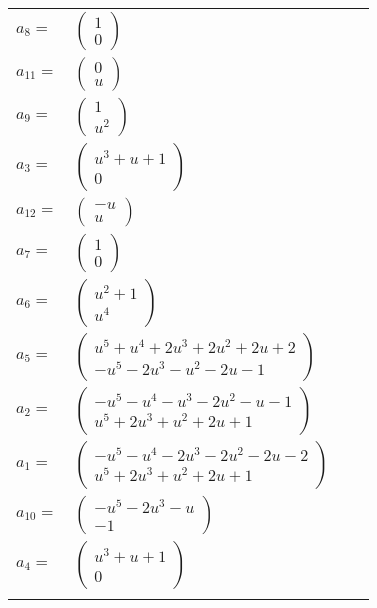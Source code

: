 \documentclass[1p]{elsarticle_modified}
\theoremstyle{definition}
\begin{document}
\begin{tabular}{m{7pt} m{180pt} m{7pt} m{180pt} }
\flushright $a_{8}=$&$\begin{pmatrix}1\\0\end{pmatrix}$ \\
\flushright $a_{11}=$&$\begin{pmatrix}0\\u\end{pmatrix}$ \\
\flushright $a_{9}=$&$\begin{pmatrix}1\\u^2\end{pmatrix}$ \\
\flushright $a_{3}=$&$\begin{pmatrix}u^3+u+1\\0\end{pmatrix}$ \\
\flushright $a_{12}=$&$\begin{pmatrix}- u\\u\end{pmatrix}$ \\
\flushright $a_{7}=$&$\begin{pmatrix}1\\0\end{pmatrix}$ \\
\flushright $a_{6}=$&$\begin{pmatrix}u^2+1\\u^4\end{pmatrix}$ \\
\flushright $a_{5}=$&$\begin{pmatrix}u^5+u^4+2 u^3+2 u^2+2 u+2\\- u^5-2 u^3- u^2-2 u-1\end{pmatrix}$ \\
\flushright $a_{2}=$&$\begin{pmatrix}- u^5- u^4- u^3-2 u^2- u-1\\u^5+2 u^3+u^2+2 u+1\end{pmatrix}$ \\
\flushright $a_{1}=$&$\begin{pmatrix}- u^5- u^4-2 u^3-2 u^2-2 u-2\\u^5+2 u^3+u^2+2 u+1\end{pmatrix}$ \\
\flushright $a_{10}=$&$\begin{pmatrix}- u^5-2 u^3- u\\-1\end{pmatrix}$ \\
\flushright $a_{4}=$&$\begin{pmatrix}u^3+u+1\\0\end{pmatrix}$\\&\end{tabular}
\end{document}
